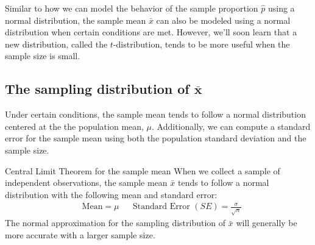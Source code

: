 \noindent%
Similar to how we can model the behavior of the
sample proportion $\hat{p}$ using a normal distribution,
the sample mean $\bar{x}$ can also be modeled using
a normal distribution when certain conditions are met.
However, we'll soon learn that a new distribution,
called the $t$-distribution,
tends to be more useful when the sample size is small.
%


\subsection[The distribution of $\bar{x}$]
    {The sampling distribution of $\mathbf{\bar{x}}$}

Under certain conditions, the sample mean tends to follow
a normal distribution centered at the the population mean, $\mu$.
Additionally, we can compute a standard error for the sample
mean using both the population standard deviation
and the sample size.

\begin{onebox}{Central Limit Theorem for the sample mean}
  When we collect a sample of independent observations,
  the sample mean $\bar{x}$ tends to follow a normal
  distribution with the following mean and standard error:
  \begin{align*}
  &\text{Mean}=\mu
  &&\text{Standard Error }(SE) = \frac{\sigma}{\sqrt{n}}
  \end{align*}
  The normal approximation for the sampling distribution
  of $\bar{x}$ will generally be more accurate with a larger
  sample size.
\end{onebox}

